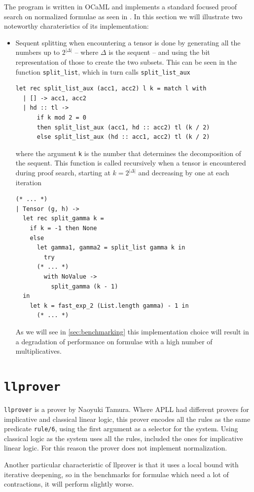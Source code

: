 \documentclass[a4paper, 12pt, tesi, english]{report}
\begin{document}
The program is written in OCaML and implements a standard focused proof search on normalized formulae as seen in \cite{LiangMiller}.
In this section we will illustrate two noteworthy charateristics of its implementation:
\begin{itemize}
	\item Sequent splitting when encountering a tensor is done by generating all the numbers up to $2^{|\Delta|}$ -- where $\Delta$ is the sequent -- and using the bit representation of those to create the two subsets.
		This can be seen in the function \texttt{split\_list}, which in turn calls \texttt{split\_list\_aux}
		\begin{verbatim}
let rec split_list_aux (acc1, acc2) l k = match l with
  | [] -> acc1, acc2
  | hd :: tl -> 
      if k mod 2 = 0 
      then split_list_aux (acc1, hd :: acc2) tl (k / 2)
      else split_list_aux (hd :: acc1, acc2) tl (k / 2)
		\end{verbatim}
		where the argument \texttt{k} is the number that determines the decomposition of the sequent.
		This function is called recursively when a tensor is encountered during proof search, starting at $ k = 2^{|\Delta|}$ and decreasing by one at each iteration
		\begin{verbatim}
(* ... *)
| Tensor (g, h) ->
  let rec split_gamma k = 
    if k = -1 then None
    else
      let gamma1, gamma2 = split_list gamma k in
        try
	  (* ... *)
        with NoValue ->
          split_gamma (k - 1) 
  in
    let k = fast_exp_2 (List.length gamma) - 1 in
      (* ... *)
		\end{verbatim}

		As we will see in \ref{sec:benchmarking} this implementation choice will result in a degradation of performance on formulae with a high number of multiplicatives.
\end{itemize}

\section{\texttt{llprover}}
\texttt{llprover} is a prover by Naoyuki Tamura.
Where APLL had different provers for implicative and classical linear logic, this prover encodes all the rules as the same predicate \texttt{rule/6}, using the first argument as a selector for the system.
Using classical logic as the system uses all the rules, included the ones for implicative linear logic.
For this reason the prover does not implement normalization.

Another particular characteristic of llprover is that it uses a local bound with iterative deepening, so in the benchmarks for formulae which need a lot of contractions, it will perform slightly worse.
\end{document}
